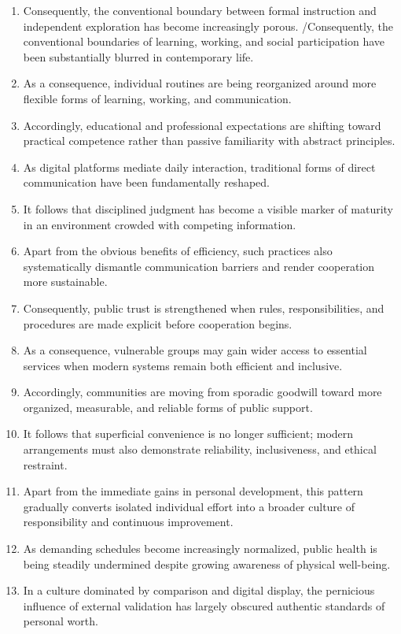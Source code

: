 \begin{enumerate}
    \item Consequently, the conventional boundary between formal instruction and independent exploration has become increasingly porous. /Consequently, the conventional boundaries of learning, working, and social participation have been substantially blurred in contemporary life. 
    \item As a consequence, individual routines are being reorganized around more flexible forms of learning, working, and communication.
    \item Accordingly, educational and professional expectations are shifting toward practical competence rather than passive familiarity with abstract principles. 
    \item As digital platforms mediate daily interaction, traditional forms of direct communication have been fundamentally reshaped.
    \item It follows that disciplined judgment has become a visible marker of maturity in an environment crowded with competing information. 
    \item Apart from the obvious benefits of efficiency, such practices also systematically dismantle communication barriers and render cooperation more sustainable. 
    \item Consequently, public trust is strengthened when rules, responsibilities, and procedures are made explicit before cooperation begins.
    \item As a consequence, vulnerable groups may gain wider access to essential services when modern systems remain both efficient and inclusive. 
    \item Accordingly, communities are moving from sporadic goodwill toward more organized, measurable, and reliable forms of public support. 
    \item It follows that superficial convenience is no longer sufficient; modern arrangements must also demonstrate reliability, inclusiveness, and ethical restraint. 
    \item Apart from the immediate gains in personal development, this pattern gradually converts isolated individual effort into a broader culture of responsibility and continuous improvement. 
    \item As demanding schedules become increasingly normalized, public health is being steadily undermined despite growing awareness of physical well-being. 
    \item In a culture dominated by comparison and digital display, the pernicious influence of external validation has largely obscured authentic standards of personal worth.
\end{enumerate}

